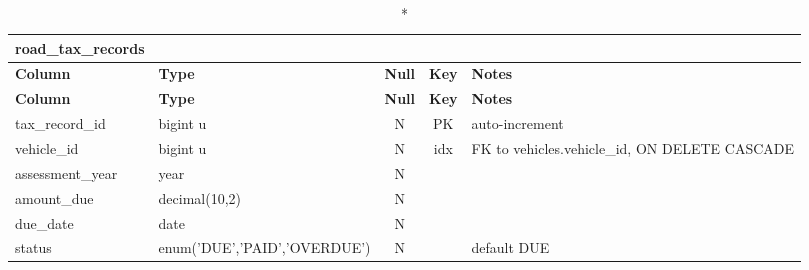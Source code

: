 \begin{longtable}{@{}p{3.4cm}p{2.9cm}c c p{5.6cm}@{}}
\caption*{\textbf{road\_\allowbreak{}tax\_\allowbreak{}records}}\\
\toprule \textbf{Column} & \textbf{Type} & \textbf{Null} & \textbf{Key} & \textbf{Notes} \\ \midrule \endfirsthead
\toprule \textbf{Column} & \textbf{Type} & \textbf{Null} & \textbf{Key} & \textbf{Notes} \\ \midrule \endhead
\bottomrule \endlastfoot
tax\_\allowbreak{}record\_\allowbreak{}id & bigint u & N & PK & auto-increment \\
vehicle\_\allowbreak{}id & bigint u & N & idx & FK to vehicles.vehicle\_\allowbreak{}id, ON DELETE CASCADE \\
assessment\_\allowbreak{}year & year & N &  &  \\
amount\_\allowbreak{}due & decimal(10,2) & N &  &  \\
due\_\allowbreak{}date & date & N &  &  \\
status & enum('DUE',\allowbreak{}'PAID',\allowbreak{}'OVERDUE') & N &  & default DUE \\
\end{longtable}
\vspace{-0.4em}
